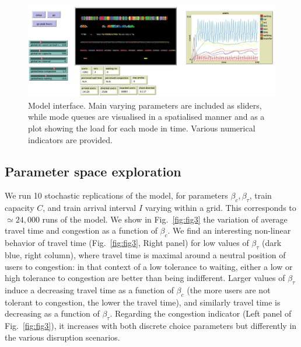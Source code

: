 \documentclass[3p,times,procedia]{elsarticle}
\begin{document}
\begin{figure}%
\begin{mdframed}
\centerline{\includegraphics[width=\linewidth]{figures/Fig2.png}}
\end{mdframed}
\caption{Model interface. Main varying parameters are included as sliders, while mode queues are visualised in a spatialised manner and as a plot showing the load for each mode in time. Various numerical indicators are provided.\label{fig:fig2}}
\end{figure}

\subsection{Parameter space exploration}

We run 10 stochastic replications of the model, for parameters $\beta_c,\beta_{\tau}$, train capacity $C$, and train arrival interval $I$ varying within a grid. This corresponds to $\simeq 24,000$ runs of the model. We show in Fig.~\ref{fig:fig3} the variation of average travel time and congestion as a function of $\beta_c$. We find an interesting non-linear behavior of travel time (Fig.~\ref{fig:fig3}, Right panel) for low values of $\beta_{\tau}$ (dark blue, right column), where travel time is maximal around a neutral position of users to congestion: in that context of a low tolerance to waiting, either a low or high tolerance to congestion are better than being indifferent. Larger values of $\beta_{\tau}$ induce a decreasing travel time as a function of $\beta_c$ (the more users are not tolerant to congestion, the lower the travel time), and similarly travel time is decreasing as a function of $\beta_{\tau}$. Regarding the congestion indicator (Left panel of Fig.~\ref{fig:fig3}), it increases with both discrete choice parameters but differently in the various disruption scenarios.
\end{document}
